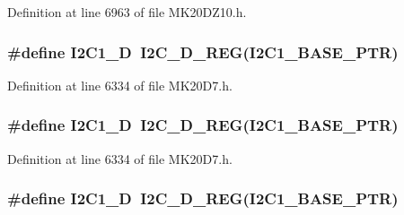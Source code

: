 Definition at line 6963 of file M\+K20\+D\+Z10.\+h.

\subsubsection[{\texorpdfstring{I2\+C1\+\_\+D}{I2C1_D}}]{\setlength{\rightskip}{0pt plus 5cm}\#define I2\+C1\+\_\+D~{\bf I2\+C\+\_\+\+D\+\_\+\+R\+EG}({\bf I2\+C1\+\_\+\+B\+A\+S\+E\+\_\+\+P\+TR})}\hypertarget{group___i2_c___register___accessor___macros_ga014dafe97b03f68e829a75997094fe92}{}\label{group___i2_c___register___accessor___macros_ga014dafe97b03f68e829a75997094fe92}


Definition at line 6334 of file M\+K20\+D7.\+h.

\subsubsection[{\texorpdfstring{I2\+C1\+\_\+D}{I2C1_D}}]{\setlength{\rightskip}{0pt plus 5cm}\#define I2\+C1\+\_\+D~{\bf I2\+C\+\_\+\+D\+\_\+\+R\+EG}({\bf I2\+C1\+\_\+\+B\+A\+S\+E\+\_\+\+P\+TR})}\hypertarget{group___i2_c___register___accessor___macros_ga014dafe97b03f68e829a75997094fe92}{}\label{group___i2_c___register___accessor___macros_ga014dafe97b03f68e829a75997094fe92}


Definition at line 6334 of file M\+K20\+D7.\+h.

\subsubsection[{\texorpdfstring{I2\+C1\+\_\+D}{I2C1_D}}]{\setlength{\rightskip}{0pt plus 5cm}\#define I2\+C1\+\_\+D~{\bf I2\+C\+\_\+\+D\+\_\+\+R\+EG}({\bf I2\+C1\+\_\+\+B\+A\+S\+E\+\_\+\+P\+TR})}\hypertarget{group___i2_c___register___accessor___macros_ga014dafe97b03f68e829a75997094fe92}{}\label{group___i2_c___register___accessor___macros_ga014dafe97b03f68e829a75997094fe92}


